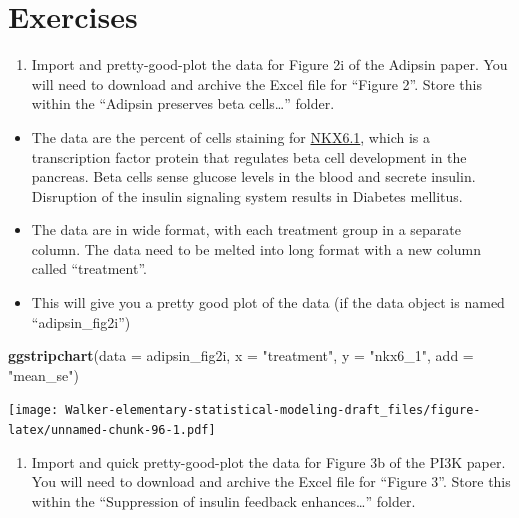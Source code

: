 \documentclass[]{book}
\newenvironment{Shaded}{\begin{snugshade}}{\end{snugshade}}
\newcommand{\DataTypeTok}[1]{\textcolor[rgb]{0.13,0.29,0.53}{#1}}
\newcommand{\KeywordTok}[1]{\textcolor[rgb]{0.13,0.29,0.53}{\textbf{#1}}}
\newcommand{\NormalTok}[1]{#1}
\newcommand{\StringTok}[1]{\textcolor[rgb]{0.31,0.60,0.02}{#1}}
\providecommand{\tightlist}{%
  \setlength{\itemsep}{0pt}\setlength{\parskip}{0pt}}
\begin{document}
\hypertarget{exercises}{%
\section{Exercises}\label{exercises}}

\begin{enumerate}
\def\labelenumi{\arabic{enumi}.}
\tightlist
\item
  Import and pretty-good-plot the data for Figure 2i of the Adipsin paper. You will need to download and archive the Excel file for ``Figure 2''. Store this within the ``Adipsin preserves beta cells\ldots{}'' folder.
\end{enumerate}

\begin{itemize}
\tightlist
\item
  The data are the percent of cells staining for \href{https://en.wikipedia.org/wiki/NKX6-1}{NKX6.1}, which is a transcription factor protein that regulates beta cell development in the pancreas. Beta cells sense glucose levels in the blood and secrete insulin. Disruption of the insulin signaling system results in Diabetes mellitus.
\item
  The data are in wide format, with each treatment group in a separate column. The data need to be melted into long format with a new column called ``treatment''.
\item
  This will give you a pretty good plot of the data (if the data object is named ``adipsin\_fig2i'')
\end{itemize}

\begin{Shaded}
\begin{Highlighting}[]
\KeywordTok{ggstripchart}\NormalTok{(}\DataTypeTok{data =}\NormalTok{ adipsin_fig2i,}
             \DataTypeTok{x =} \StringTok{"treatment"}\NormalTok{,}
             \DataTypeTok{y =} \StringTok{"nkx6_1"}\NormalTok{,}
             \DataTypeTok{add =} \StringTok{"mean_se"}\NormalTok{)}
\end{Highlighting}
\end{Shaded}

\texttt{[image: Walker-elementary-statistical-modeling-draft\_files/figure-latex/unnamed-chunk-96-1.pdf]}

\begin{enumerate}
\def\labelenumi{\arabic{enumi}.}
\setcounter{enumi}{1}
\tightlist
\item
  Import and quick pretty-good-plot the data for Figure 3b of the PI3K paper. You will need to download and archive the Excel file for ``Figure 3''. Store this within the ``Suppression of insulin feedback enhances\ldots{}'' folder.
\end{enumerate}
\end{document}
